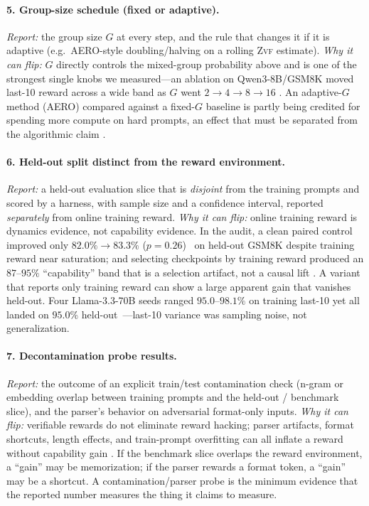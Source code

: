 \documentclass[11pt]{article}
\newcommand{\zvf}{\textsc{Zvf}}
\begin{document}
\paragraph{5. Group-size schedule (fixed or adaptive).}
\emph{Report:} the group size $G$ at every step, and the rule that changes it
if it is adaptive (e.g.\ AERO-style doubling/halving on a rolling \zvf{}
estimate). \emph{Why it can flip:} $G$ directly controls the mixed-group
probability above and is one of the strongest single knobs we measured---an
ablation on Qwen3-8B/GSM8K moved last-10 reward across a wide band as $G$ went
$2\!\to\!4\!\to\!8\!\to\!16$ \cite{zvfaudit2026}. An adaptive-$G$ method (AERO)
compared against a fixed-$G$ baseline is partly being credited for spending
more compute on hard prompts, an effect that must be separated from the
algorithmic claim \cite{zhang2026aero}.

\paragraph{6. Held-out split distinct from the reward environment.}
\emph{Report:} a held-out evaluation slice that is \emph{disjoint} from the
training prompts and scored by a harness, with sample size and a confidence
interval, reported \emph{separately} from online training reward. \emph{Why it
can flip:} online training reward is dynamics evidence, not capability
evidence. In the audit, a clean paired control improved only $82.0\%\to83.3\%$
($p=0.26$)~\citep{zvfaudit2026} on held-out GSM8K despite training reward near saturation; and
selecting checkpoints by training reward produced an $87$--$95\%$ ``capability''
band that is a selection artifact, not a causal lift \cite{zvfaudit2026}. A
variant that reports only training reward can show a large apparent gain that
vanishes held-out. Four Llama-3.3-70B seeds ranged $95.0$--$98.1\%$ on training
last-10 yet all landed on $95.0\%$ held-out~\citep{zvfaudit2026}---last-10 variance was
sampling noise, not generalization.

\paragraph{7. Decontamination probe results.}
\emph{Report:} the outcome of an explicit train/test contamination check
(n-gram or embedding overlap between training prompts and the held-out /
benchmark slice), and the parser's behavior on adversarial format-only inputs.
\emph{Why it can flip:} verifiable rewards do not eliminate reward hacking;
parser artifacts, format shortcuts, length effects, and train-prompt overfitting
can all inflate a reward without capability gain \cite{zvfaudit2026}. If the
benchmark slice overlaps the reward environment, a ``gain'' may be memorization;
if the parser rewards a format token, a ``gain'' may be a shortcut. A
contamination/parser probe is the minimum evidence that the reported number
measures the thing it claims to measure.
\end{document}

